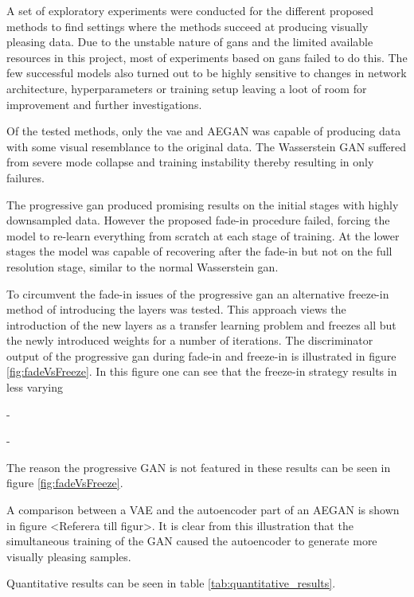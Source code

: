 A set of exploratory experiments were conducted for the different proposed methods to find settings where the methods succeed at producing visually pleasing data. Due to the unstable nature of \acrshort{gans} and the limited available resources in this project, most of experiments based on \acrshort{gans} failed to do this. The few successful models also turned out to be highly sensitive to changes in network architecture, hyperparameters or training setup leaving a loot of room for improvement and further investigations. 

Of the tested methods, only the \acrshort{vae} and AEGAN was capable of producing data with some visual resemblance to the original data. The Wasserstein GAN suffered from severe mode collapse and training instability thereby resulting in only failures.

The progressive \acrshort{gan} produced promising results on the initial stages with highly downsampled data. However the proposed fade-in procedure failed, forcing the model to re-learn everything from scratch at each stage of training. At the lower stages the model was capable of recovering after the fade-in but not on the full resolution stage, similar to the normal Wasserstein \acrshort{gan}. 

To circumvent the fade-in issues of the progressive \acrshort{gan} an alternative freeze-in method of introducing the layers was tested. This approach views the introduction of the new layers as a transfer learning problem and freezes all but the newly introduced weights for a number of iterations. The discriminator output of the progressive \acrshort{gan} during fade-in and freeze-in is illustrated in figure \ref{fig:fadeVsFreeze}. In this figure one can see that the freeze-in strategy results in less varying 


-

-


The reason the progressive GAN is not featured in these results can be seen in figure \ref{fig:fadeVsFreeze}.

A comparison between a VAE and the autoencoder part of an AEGAN is shown in figure <Referera till figur>. It is clear from this illustration that the simultaneous training of the GAN caused the autoencoder to generate more visually pleasing samples.

Quantitative results can be seen in table \ref{tab:quantitative_results}.

